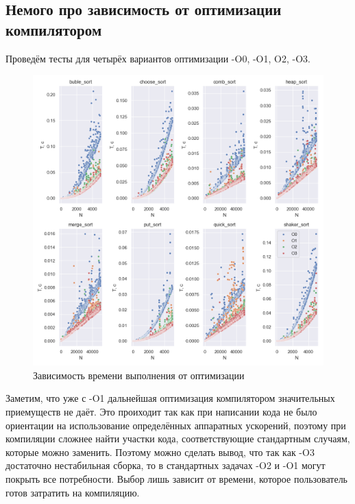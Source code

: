 \documentclass[12pt,a4paper]{article}
\begin{document}
\subsection{Немого про зависимость от оптимизации компилятором}
Проведём тесты для четырёх вариантов оптимизации -O0, -O1, O2, -O3.
\begin{figure}[!ht]
\includegraphics[width=\textwidth]{imgs/compare_by_optimizaion.png}
\caption{Зависимость времени выполнения от оптимизации}
\end{figure}
Заметим, что уже с -O1 дальнейшая оптимизация компилятором значительных приемуществ не даёт. Это проиходит так как при написании кода не было ориентации на использование определённых аппаратных ускорений, поэтому при компиляции сложнее найти участки кода, соответствующие стандартным случаям, которые можно заменить. Поэтому можно сделать вывод, что так как -O3 достаточно нестабильная сборка, то в стандартных задачах -O2 и -O1 могут покрыть все потребности. Выбор лишь зависит от времени, которое пользователь готов затратить на компиляцию.
\end{document}
